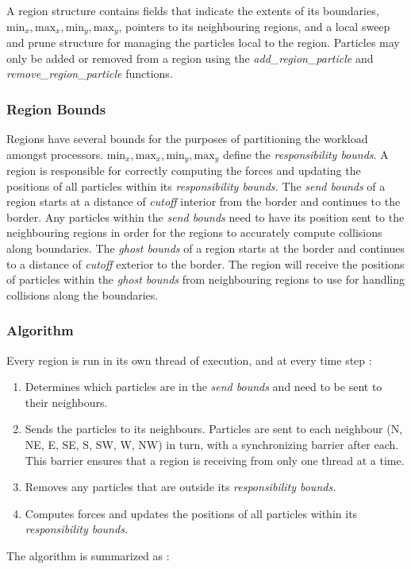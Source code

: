 \documentclass[11pt]{article} %
\begin{document}
A region structure contains fields that indicate the extents of its
boundaries, $\text{min}_{x},\text{max}_{x},\text{min}_{y},\text{max}_{y}$,
pointers to its neighbouring regions, and a local sweep and prune
structure for managing the particles local to the region. Particles
may only be added or removed from a region using the \emph{add\_region\_particle
}and \emph{remove\_region\_particle} functions.


\subsubsection{Region Bounds}

Regions have several bounds for the purposes of partitioning the workload
amongst processors. $\text{min}_{x},\text{max}_{x},\text{min}_{y},\text{max}_{y}$
define the \emph{responsibility bounds}. A region is responsible for
correctly computing the forces and updating the positions of all particles
within its \emph{responsibility bounds.} The \emph{send bounds }of
a region starts at a distance of \emph{cutoff }interior from the border
and continues to the border. Any particles within the \emph{send bounds
}need to have its position sent to the neighbouring regions in order
for the regions to accurately compute collisions along boundaries.
The \emph{ghost bounds }of a region starts at the border and continues
to a distance of \emph{cutoff }exterior to the border. The region
will receive the positions of particles within the \emph{ghost bounds}
from neighbouring regions to use for handling collisions along the
boundaries.


\subsubsection{Algorithm}

Every region is run in its own thread of execution, and at every time
step :
\begin{enumerate}
\item Determines which particles are in the \emph{send bounds} and need
to be sent to their neighbours.
\item Sends the particles to its neighbours. Particles are sent to each
neighbour (N, NE, E, SE, S, SW, W, NW) in turn, with a synchronizing
barrier after each. This barrier ensures that a region is receiving
from only one thread at a time.
\item Removes any particles that are outside its \emph{responsibility bounds.}
\item Computes forces and updates the positions of all particles within
its \emph{responsibility bounds.}
\end{enumerate}
The algorithm is summarized as :
\end{document}

